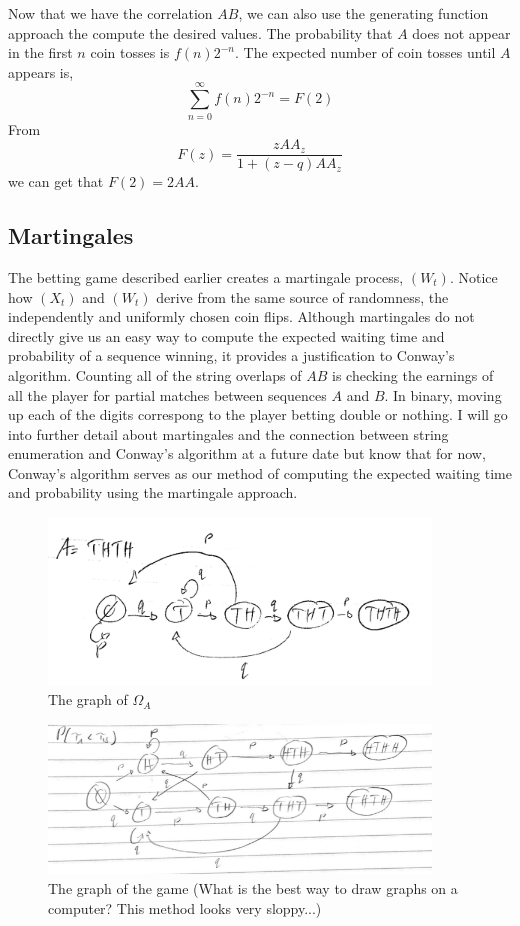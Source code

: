 \documentclass{article}
\numberwithin{mytheorem}{subsection} %
\begin{document}
			Now that we have the correlation $AB$, we can also use the generating function approach the compute the desired values. The probability that $A$ does not appear in the first $n$ coin tosses is $f(n)2^{-n}$. The expected number of coin tosses until $A$ appears is,
			$$\sum_{n=0}^\infty f(n) 2^{-n} = F(2)$$
			From 
			$$F(z) = \frac{zAA_z}{1+(z-q)AA_z}$$
			we can get that $F(2) = 2AA$. \cite{enumerate} \cite{gardner}
		\subsection{Martingales}
			The betting game described earlier creates a martingale process, $(W_t)$. Notice how $(X_t)$ and $(W_t)$ derive from the same source of randomness, the independently and uniformly chosen coin flips. Although martingales do not directly give us an easy way to compute the expected waiting time and probability of a sequence winning, it provides a justification to Conway's algorithm. Counting all of the string overlaps of $AB$ is checking the earnings of all the player for partial matches between sequences $A$ and $B$. In binary, moving up each of the digits correspong to the player betting double or nothing. I will go into further detail about martingales and the connection between string enumeration and Conway's algorithm at a future date but know that for now, Conway's algorithm serves as our method of computing the expected waiting time and probability using the martingale approach.

		\begin{figure}[h]
			\begin{center}
				\includegraphics[width=4.0in]{GameOfA}
			\end{center}
		
			\caption{The graph of $\Omega_A$}
			\label{perfect_fig}
		\end{figure}
		\begin{figure}[h]
			\begin{center}
				\includegraphics[width=4.0in]{winning}
			\end{center}
		
			\caption{The graph of the game (What is the best way to draw graphs on a computer? This method looks very sloppy...)}
			\label{perfect_fig}
		\end{figure}
\end{document}
